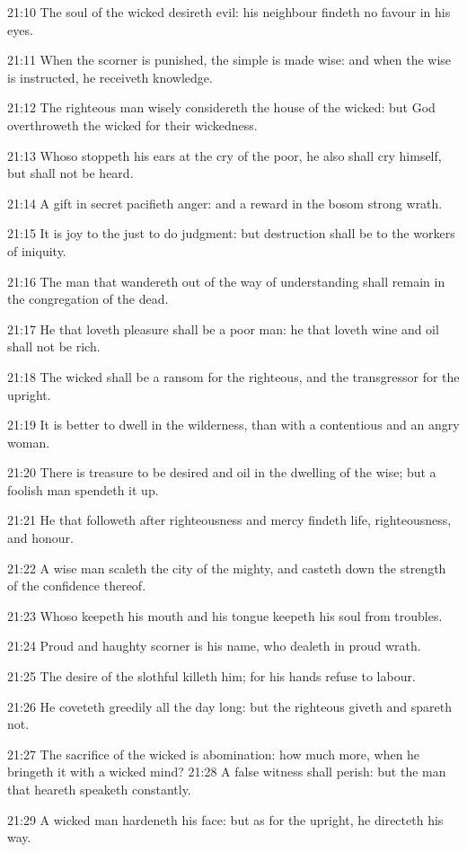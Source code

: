 21:10 The soul of the wicked desireth evil: his neighbour findeth no
favour in his eyes.

21:11 When the scorner is punished, the simple is made wise: and when
the wise is instructed, he receiveth knowledge.

21:12 The righteous man wisely considereth the house of the wicked:
but God overthroweth the wicked for their wickedness.

21:13 Whoso stoppeth his ears at the cry of the poor, he also shall
cry himself, but shall not be heard.

21:14 A gift in secret pacifieth anger: and a reward in the bosom
strong wrath.

21:15 It is joy to the just to do judgment: but destruction shall be
to the workers of iniquity.

21:16 The man that wandereth out of the way of understanding shall
remain in the congregation of the dead.

21:17 He that loveth pleasure shall be a poor man: he that loveth wine
and oil shall not be rich.

21:18 The wicked shall be a ransom for the righteous, and the
transgressor for the upright.

21:19 It is better to dwell in the wilderness, than with a contentious
and an angry woman.

21:20 There is treasure to be desired and oil in the dwelling of the
wise; but a foolish man spendeth it up.

21:21 He that followeth after righteousness and mercy findeth life,
righteousness, and honour.

21:22 A wise man scaleth the city of the mighty, and casteth down the
strength of the confidence thereof.

21:23 Whoso keepeth his mouth and his tongue keepeth his soul from
troubles.

21:24 Proud and haughty scorner is his name, who dealeth in proud
wrath.

21:25 The desire of the slothful killeth him; for his hands refuse to
labour.

21:26 He coveteth greedily all the day long: but the righteous giveth
and spareth not.

21:27 The sacrifice of the wicked is abomination: how much more, when
he bringeth it with a wicked mind?  21:28 A false witness shall
perish: but the man that heareth speaketh constantly.

21:29 A wicked man hardeneth his face: but as for the upright, he
directeth his way.

